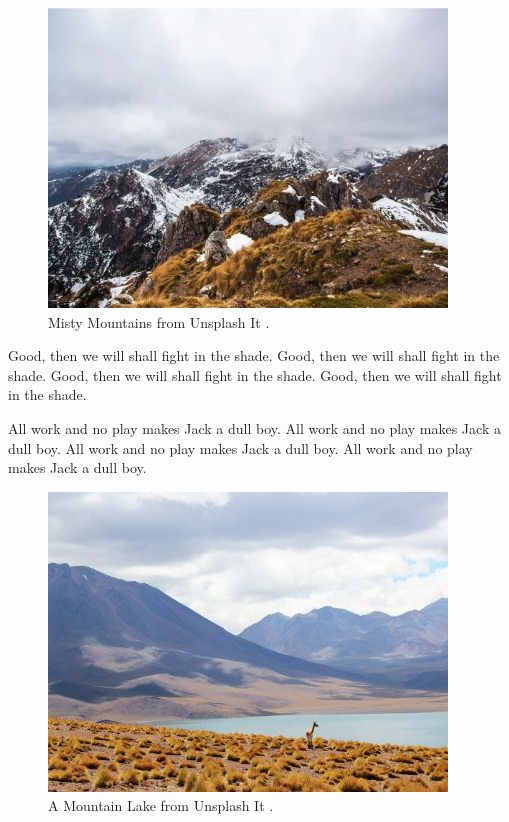 \begin{figure}[h]
\centering
\includegraphics[width=\linewidth,natwidth=400,natheight=300]{../figures/mountains.jpg}
\caption{Misty Mountains from Unsplash It \cite{unsplash}.}
\label{fig:mountains}
\end{figure}

Good, then we will shall fight in the shade.
Good, then we will shall fight in the shade.
Good, then we will shall fight in the shade.
Good, then we will shall fight in the shade.

All work and no play makes Jack a dull boy.
All work and no play makes Jack a dull boy.
All work and no play makes Jack a dull boy.
All work and no play makes Jack a dull boy.

\begin{figure}[h]
\centering
\includegraphics[width=\linewidth,natwidth=400,natheight=300]{../figures/lake.jpg}
\caption{A Mountain Lake from Unsplash It \cite{unsplash}.}
\label{fig:lake}
\end{figure}
